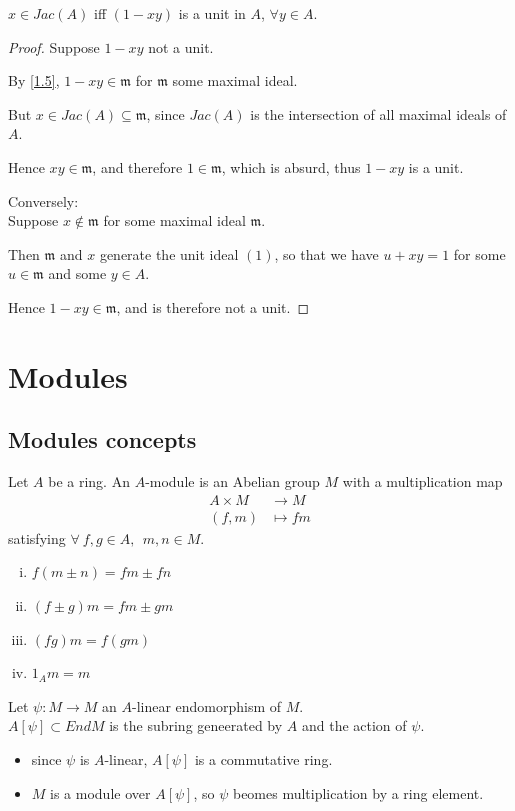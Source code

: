 \documentclass{article}
\theoremstyle{definition}
\newenvironment{prop}[1]
{\renewcommand\theinnerprop{#1}\innerprop}
{\endinnerprop}
\newcommand{\mM}{\mathfrak{m}}
\begin{document}
\begin{prop}{AM.1.9} \label{1.9}
  $x \in Jac(A)$ iff $(1 - xy)$ is a unit in $A$, $\forall y \in A$.
\end{prop}
\begin{proof}
  Suppose $1-xy$ not a unit.

  By \ref{1.5}, $1-xy \in \mM$ for $\mM$ some maximal ideal.

  But $x \in Jac(A) \subseteq \mM$, since $Jac(A)$ is the intersection of all maximal ideals of $A$.

  Hence $xy \in \mM$, and therefore $1 \in \mM$, which is absurd, thus $1-xy$ is a unit.

  Conversely:\\
  Suppose $x \not\in \mM$ for some maximal ideal $\mM$.

  Then $\mM$ and $x$ generate the unit ideal $(1)$, so that we have $u + xy = 1$ for some $u \in \mM$ and some $y \in A$.

  Hence $1 -xy \in \mM$, and is therefore not a unit.
\end{proof}

\section{Modules}

\subsection{Modules concepts}

Let $A$ be a ring. An $A$-module is an Abelian group $M$ with a multiplication
map
\begin{align*}
  A \times M &\longrightarrow M\\
  (f, m) &\longmapsto fm
\end{align*}
satisfying $\forall~ f,g \in A,~~ m, n \in M$.
\begin{enumerate}[i.]
  \item $f(m \pm n)=fm \pm fn$
  \item $(f \pm g) m = fm \pm gm$
  \item $(fg) m = f(gm)$
  \item $1_A m = m$
\end{enumerate}

Let $\psi: M \longrightarrow M$ an $A$-linear endomorphism of $M$.\\
$A[\psi] \subset End M$ is the subring geneerated by $A$ and the action of $\psi$.
\begin{itemize}
\item since $\psi$ is $A$-linear, $A[\psi]$ is a commutative ring.
\item $M$ is a module over $A[\psi]$, so $\psi$ beomes multiplication by a ring element.
\end{itemize}
\end{document}
